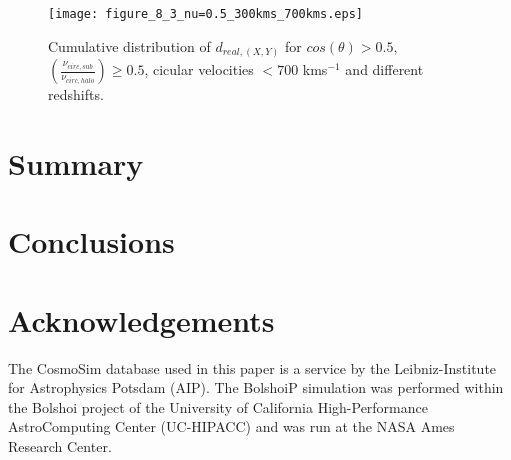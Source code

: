 \documentclass[12pt,preprint]{aastex}
\begin{document}
\begin{figure*}
\begin{center}
\texttt{[image: figure\_8\_3\_nu=0.5\_300kms\_700kms.eps]}
\end{center}
\caption{Cumulative distribution of $d_{real, (X,Y)}$ for $cos(\theta)>0.5$, $\left(\frac{\nu_{circ,sub}}{\nu_{circ,halo}}\right)\geq0.5$, 
cicular velocities $<700$ kms$^{-1}$ and different redshifts.} 
\label{cumulative_cos}
\end{figure*}


\section{Summary}
\label{summary}



\section{Conclusions}
\label{conclusions}


\section*{Acknowledgements}

The CosmoSim database used in this paper is a service by the Leibniz-Institute for Astrophysics Potsdam (AIP). The 
BolshoiP simulation was performed within the Bolshoi project of the University of California High-Performance 
AstroComputing Center (UC-HIPACC) and was run at the NASA Ames Research Center.
\end{document}
